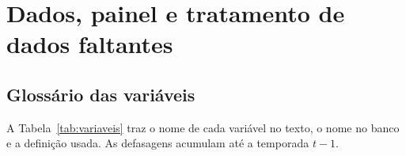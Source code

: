 
\section{Dados, painel e tratamento de dados faltantes}
\label{apx:dados}

\subsection{Glossário das variáveis}
\label{apx:glossario}

A Tabela~\ref{tab:variaveis} traz o nome de cada variável no texto, o nome no banco e a definição usada. As defasagens acumulam até a temporada $t-1$.

